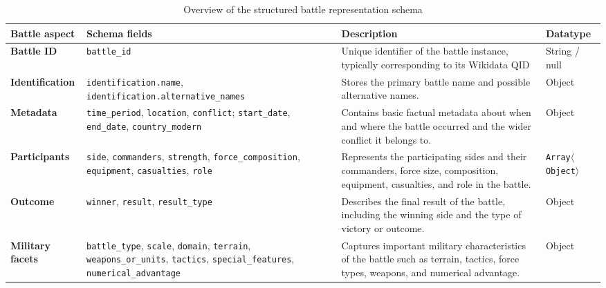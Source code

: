 \begin{table}[!htbp]
\centering
\caption{Overview of the structured battle representation schema}
\label{tab:battle_schema}

\footnotesize
\renewcommand{\arraystretch}{1.4}
\setlength{\tabcolsep}{4pt}

\begin{tabular}{
    >{\RaggedRight\arraybackslash}p{}
    >{\RaggedRight\arraybackslash}p{}
    >{\RaggedRight\arraybackslash}p{}
    >{\RaggedRight\arraybackslash}p{}
}
\toprule
\textbf{Battle aspect} &
\textbf{Schema fields} &
\textbf{Description} &
\textbf{Datatype} \\
\midrule

\textbf{Battle ID} &
\texttt{battle\_id} &
Unique identifier of the battle instance, typically corresponding
to its Wikidata QID&
String / null \\
\midrule

\textbf{Identification} &
\texttt{identification.name},
\texttt{identification.alternative\_names} &
Stores the primary battle name and possible alternative names. &
Object \\
\midrule

\textbf{Metadata} &
\texttt{time\_period},
\texttt{location},
\texttt{conflict};
 \texttt{start\_date},
\texttt{end\_date},
\texttt{country\_modern} &
Contains basic factual metadata about when and where the battle
occurred and the wider conflict it belongs to. &
Object \\
\midrule

\textbf{Participants} &
\texttt{side},
\texttt{commanders},
\texttt{strength},
\texttt{force\_composition},
\texttt{equipment},
\texttt{casualties},
\texttt{role} &
Represents the participating sides and their commanders,
force size, composition, equipment, casualties, and role
in the battle. &
\texttt{Array}$\langle$\texttt{Object}$\rangle$ \\
\midrule

\textbf{Outcome} &
\texttt{winner},
\texttt{result},
\texttt{result\_type} &
Describes the final result of the battle, including the
winning side and the type of victory or outcome. &
Object \\
\midrule

\textbf{Military facets} &
\texttt{battle\_type},
\texttt{scale},
\texttt{domain},
\texttt{terrain},
\texttt{weapons\_or\_units},
\texttt{tactics},
\texttt{special\_features},
\texttt{numerical\_advantage} &
Captures important military characteristics of the battle
such as terrain, tactics, force types, weapons, and
numerical advantage. &
Object \\
\midrule


\end{tabular}
\end{table}
